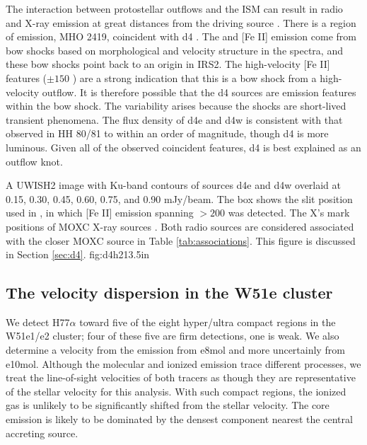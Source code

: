 The interaction between protostellar outflows and the ISM can result in radio
and X-ray emission at great distances from the driving source \citep[e.g.,
HH80/81][]{Lopez-Santiago2013a,Masque2015a}.  There is a region of \hh emission,
MHO 2419, coincident with d4 \citep[Figure
\ref{fig:d4h2}][]{Hodapp2002a,Froebrich2011a}.  The \hh and [Fe II] emission
come from bow shocks based on morphological and velocity structure in the
\citet{Hodapp2002a} spectra, and these bow shocks point back to an origin in
IRS2.  The high-velocity [Fe II] features ($\pm150$ \kms) are a strong
indication that this is a bow shock from a high-velocity outflow.  It is
therefore possible that the d4 sources are emission features within the bow
shock.  The variability arises because the shocks are short-lived transient
phenomena.  The flux density of d4e and d4w is consistent with that observed
in HH 80/81 \citep{Masque2015a} to within an order of magnitude, though d4
is more luminous.  Given all of the observed coincident features, d4 is best
explained as an outflow knot.  

{A UWISH2 \hh image with Ku-band contours of sources d4e and d4w overlaid at
0.15, 0.30, 0.45, 0.60, 0.75, and 0.90 mJy/beam.  The box shows the slit
position used in \citet{Hodapp2002a}, in which [Fe II] emission spanning
$>200$ \kms was detected.  The X's mark positions of MOXC X-ray
sources \citep{Townsley2014a}.  Both radio sources are considered
associated with the closer MOXC source in Table \ref{tab:associations}.
This figure is discussed in Section \ref{sec:d4}.
}
{fig:d4h2}{1}{3.5in}

\subsection{The velocity dispersion in the W51e cluster}
\label{sec:vdisp}
We detect H77$\alpha$ toward five of the eight hyper/ultra compact \hii regions
in the W51e1/e2 cluster; four of these five are firm detections, one
is weak.  We also determine a velocity from the \formaldehyde emission from
e8mol and more uncertainly from e10mol.  Although the molecular and ionized
emission trace different processes, we treat the line-of-sight velocities of
both tracers as though they are representative of the stellar velocity for this
analysis.  With such compact \hii regions, the ionized gas is unlikely to be
significantly shifted from the stellar velocity.  The core emission is likely
to be dominated by the densest component nearest the central accreting source.

